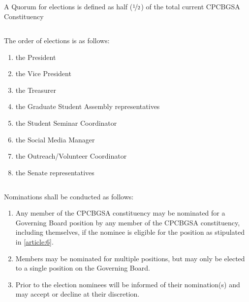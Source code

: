 \documentclass[11pt,a4paper]{article}
\begin{document}
\subsection{}A Quorum for elections is defined as half ($\nicefrac{1}{2}$) of the total current CPCBGSA Constituency

\subsection{} The order of elections is as follows:
\begin{enumerate}        
	\item the President
	\item the Vice President
	\item the Treasurer
	\item the Graduate Student Assembly representatives
	\item the Student Seminar Coordinator
	\item the Social Media Manager
	\item the Outreach/Volunteer Coordinator
	\item the Senate representatives 
\end{enumerate}        
 
\subsection{}Nominations shall be conducted as follows:
\begin{enumerate}        
	\item   Any member of the CPCBGSA constituency may be nominated for a Governing Board position by any member of the CPCBGSA constituency, including themselves, if the nominee is eligible for the position as stipulated in \cref{article:6}.
	\item  Members may be nominated for multiple positions, but may only be elected to a single position on the Governing Board.
	\item Prior to the election nominees will be informed of their nomination(s) and may accept or decline at their discretion.
\end{enumerate}        
 
\end{document}

